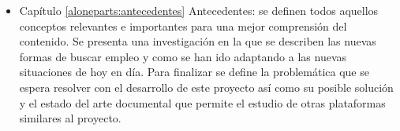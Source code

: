 	\begin{itemize}
		
		\item Capítulo \ref{aloneparts:antecedentes} Antecedentes:
		se definen todos aquellos conceptos relevantes e importantes para una mejor comprensión del contenido. 
		Se presenta una investigación en la que se describen las nuevas formas de buscar empleo y como se han ido adaptando 
		a las nuevas situaciones de hoy en día. Para finalizar se define la problemática que se espera resolver con el desarrollo 
		de este proyecto así como su posible solución y el estado del arte documental que permite el estudio de otras plataformas 
		similares al proyecto.
		
		
		

%
%



		

\end{itemize}




